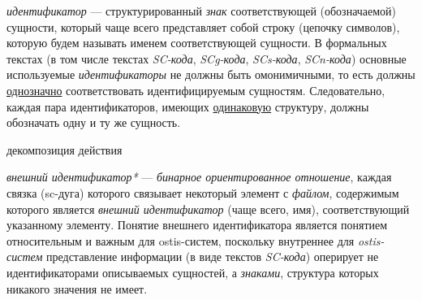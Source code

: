 \textit{идентификатор} --- структурированный \textit{знак} соответствующей (обозначаемой) сущности, который чаще всего представляет собой строку (цепочку символов), которую будем называть именем соответствующей сущности.
В формальных текстах (в том числе текстах \textit{SC-кода}, \textit{SCg-кода}, \textit{SCs-кода}, \textit{SCn-кода}) основные используемые \textit{идентификаторы} не должны быть омонимичными, то есть должны \underline{однозначно} соответствовать идентифицируемым сущностям.
Следовательно, каждая пара идентификаторов, имеющих \underline{одинаковую} структуру, должны обозначать одну и ту же сущность.

\begin{SCn}

    \begin{scnrelfromset}{декомпозиция действия}
        \begin{scnindent}
        \end{scnindent}
        \begin{scnindent}
        \end{scnindent}
    \end{scnrelfromset}

\end{SCn}

\textit{внешний идентификатор*} --- \textit{бинарное ориентированное отношение}, каждая связка (sc-дуга) которого связывает некоторый элемент с \textit{файлом}, содержимым которого является \textit{внешний идентификатор} (чаще всего, имя), соответствующий указанному элементу.
Понятие внешнего идентификатора является понятием относительным и важным для ostis-систем, поскольку внутреннее для \textit{ostis-систем} представление информации (в виде текстов \textit{SC-кода}) оперирует не идентификаторами описываемых сущностей, а \textit{знаками}, структура которых никакого значения не имеет.



